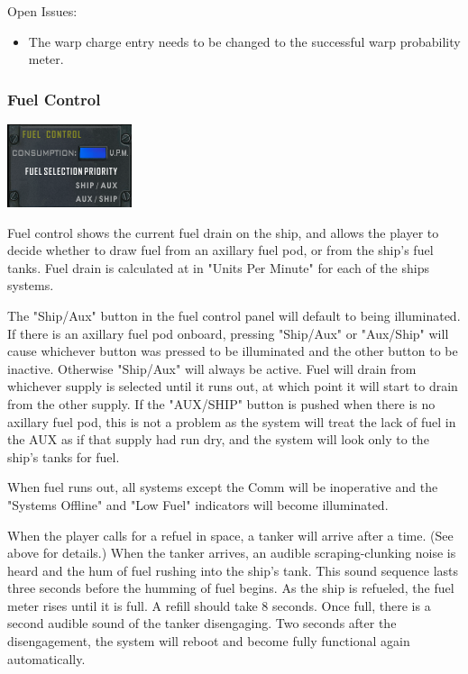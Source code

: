 \begin{itemize}
Open Issues:
\begin{itemize}
\item The warp charge entry needs to be changed to the successful warp
probability meter.
\end{itemize}

\subsubsection{Fuel Control}
\includegraphics[scale=0.70]{images/fuelcontrol.png}

Fuel control shows the current fuel drain on the ship, and allows the player
to decide whether to draw fuel from an axillary fuel pod, or from the
ship's fuel tanks.  Fuel drain is calculated at in "Units Per Minute" for
each of the ships systems.

The "Ship\slash Aux" button in the fuel control panel will default to
being illuminated.  If there is an axillary fuel pod onboard, pressing
"Ship\slash Aux" or "Aux\slash Ship" will cause whichever button was
pressed to be illuminated and the other button to be inactive.  Otherwise
"Ship\slash Aux" will always be active.  Fuel will drain from whichever
supply is selected until it runs out, at which point it will start to drain
from the other supply.  If the "AUX\slash SHIP" button is pushed when there is no axillary
fuel pod, this is not a problem as the system will treat the lack of fuel in the AUX as if that supply had run dry, and the system will look only to the ship's tanks for fuel. 

When fuel runs out, all systems except the Comm will be inoperative and
the "Systems Offline" and "Low Fuel" indicators will become illuminated.

When the player calls for a refuel in space, a tanker will arrive after a time. (See above for details.) When the tanker arrives, an audible scraping-clunking noise is heard and the hum of fuel rushing into the ship's tank. This sound sequence lasts three seconds before the humming of fuel begins. As the ship is refueled, the fuel meter rises until it is full. A refill should take 8 seconds. Once full, there is a second audible sound of the tanker disengaging. Two seconds after the disengagement, the system will reboot and become fully functional again automatically. 



\end{itemize}
